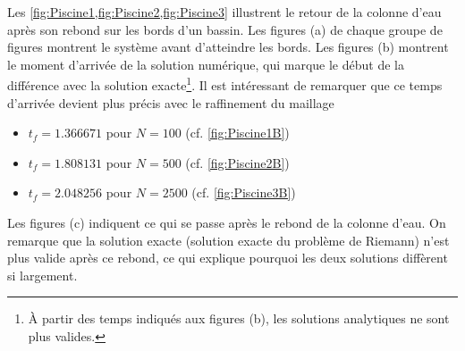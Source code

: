 \documentclass[
	french,
	11pt, %
]{fphw}
\begin{document}
\noindent Les \cref{fig:Piscine1,fig:Piscine2,fig:Piscine3} illustrent le retour de la colonne d'eau après son rebond sur les bords d'un bassin. Les figures (a) de chaque groupe de figures montrent le système avant d'atteindre les bords. Les figures (b) montrent le moment d'arrivée de la solution numérique, qui marque le début de la différence avec la solution exacte\footnote{À partir des temps indiqués aux figures (b), les solutions analytiques ne sont plus valides.}. Il est intéressant de remarquer que ce temps d'arrivée devient plus précis avec le raffinement du maillage 
\begin{itemize}
	\item $t_{f}=1.366671$ pour $N=100$ (cf. \cref{fig:Piscine1B})
	\item $t_{f}=1.808131$ pour $N=500$ (cf. \cref{fig:Piscine2B})
	\item $t_{f}=2.048256$ pour $N=2500$ (cf. \cref{fig:Piscine3B})
\end{itemize}
Les figures (c) indiquent ce qui se passe après le rebond de la colonne d'eau. On remarque que la solution exacte (solution exacte du problème de Riemann) n'est plus valide après ce rebond, ce qui explique pourquoi les deux solutions diffèrent si largement.
\end{document}
